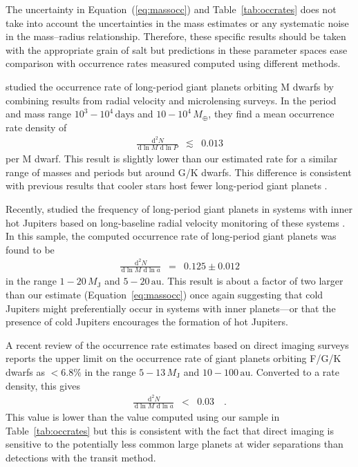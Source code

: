 \documentclass[manuscript, letterpaper]{aastex6}
\renewcommand{\eqref}[1]{\ref{eq:#1}}
\newcommand{\Eq}[1]{Equation~(\eqref{#1})}
\newcommand{\eq}[1]{\Eq{#1}}
\newcommand{\eqalt}[1]{Equation~\eqref{#1}}
\newcommand{\dd}{\ensuremath{\,\mathrm{d}}}
\newcommand{\unit}[1]{{\ensuremath{\,\mathrm{#1}}}}
\begin{document}
The uncertainty in \eq{massocc} and Table~\ref{tab:occrates} does not take
into account the uncertainties in the mass estimates or any systematic noise
in the mass--radius relationship.
Therefore, these specific results should be taken with the appropriate grain
of salt but predictions in these parameter spaces ease comparison with
occurrence rates measured computed using different methods.

\citet{Clanton:2014} studied the occurrence rate of long-period giant planets
orbiting M dwarfs by combining results from radial velocity and microlensing
surveys.
In the period and mass range $10^3-10^4\unit{days}$ and $10-10^4\,M_\oplus$,
they find a mean occurrence rate density of
\begin{eqnarray}
\frac{\dd^2 N}{\dd\ln M\,\dd\ln P} &\lesssim& 0.013
\end{eqnarray}
per M dwarf.
This result is slightly lower than our estimated rate for a similar range of
masses and periods but around G/K dwarfs.
This difference is consistent with previous results that cooler stars host
fewer long-period giant planets \citep[for example][]{Cumming:2008}.

Recently, \citet{Bryan:2016} studied the frequency of long-period giant
planets in systems with inner hot Jupiters based on long-baseline radial
velocity monitoring of these systems \citep{Knutson:2014}.
In this sample, the computed occurrence rate of long-period giant planets was
found to be
\begin{eqnarray}
\frac{\dd^2 N}{\dd\ln M\,\dd\ln a} &=& 0.125 \pm 0.012
\end{eqnarray}
in the range $1-20\,M_\mathrm{J}$ and $5-20\unit{au}$.
This result is about a factor of two larger than our estimate
(\eqalt{massocc}) once again suggesting that cold Jupiters might
preferentially occur in systems with inner planets---or that the 
presence of cold Jupiters encourages the formation of hot Jupiters. 


A recent review of the occurrence rate estimates based on direct imaging
surveys \citep{Bowler:2016} reports the upper limit on the occurrence rate of
giant planets orbiting F/G/K dwarfs as $<6.8\%$ in the range
$5-13\,M_\mathrm{J}$ and $10-100\unit{au}$.
Converted to a rate density, this gives
\begin{eqnarray}
\frac{\dd^2 N}{\dd\ln M\,\dd\ln a} &<& 0.03 \quad.
\end{eqnarray} This value is lower than the value computed using our sample in
Table~\ref{tab:occrates} but this is consistent with the fact that direct
imaging is sensitive to the potentially less common large planets at wider
separations than detections with the transit method.
\end{document}

